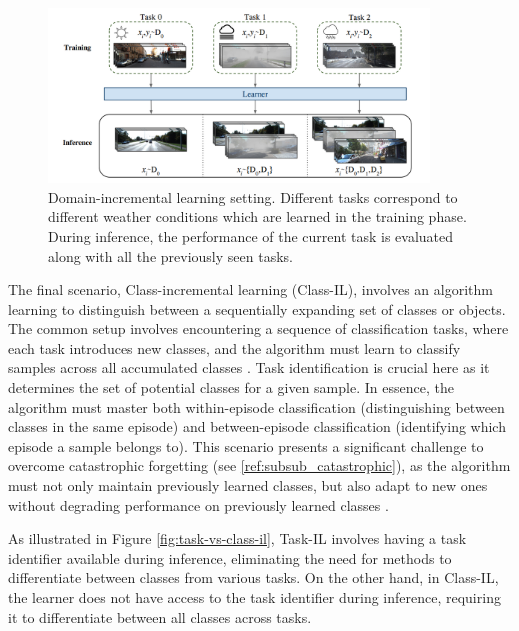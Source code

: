 \begin{figure}[H]
    \centering
    \includegraphics[width=0.9\textwidth]{Images/domain_incremental_weather.png}
    \caption{Domain-incremental learning setting. Different tasks correspond to different weather conditions which are learned in the training phase. During inference, the performance of the current task is evaluated along with all the previously seen tasks. \citep{mirza2022efficient}}
    \label{fig:domain-incremental-weather}
\end{figure}


The final scenario, Class-incremental learning (Class-IL), involves an algorithm learning to distinguish between a sequentially expanding set of classes or objects. The common setup involves encountering a sequence of classification tasks, where each task introduces new classes, and the algorithm must learn to classify samples across all accumulated classes \citep{von2019continual, van2020brain}. Task identification is crucial here as it determines the set of potential classes for a given sample. In essence, the algorithm must master both within-episode classification (distinguishing between classes in the same episode) and between-episode classification (identifying which episode a sample belongs to). This scenario presents a significant challenge to overcome catastrophic forgetting (see \ref{ref:subsub_catastrophic}), as the algorithm must not only maintain previously learned classes, but also adapt to new ones without degrading performance on previously learned classes \citep{belouadah2021comprehensive, masana2022class}. 

As illustrated in Figure \ref{fig:task-vs-class-il}, Task-IL involves having a task identifier available during inference, eliminating the need for methods to differentiate between classes from various tasks. On the other hand, in Class-IL, the learner does not have access to the task identifier during inference, requiring it to differentiate between all classes across tasks. 

